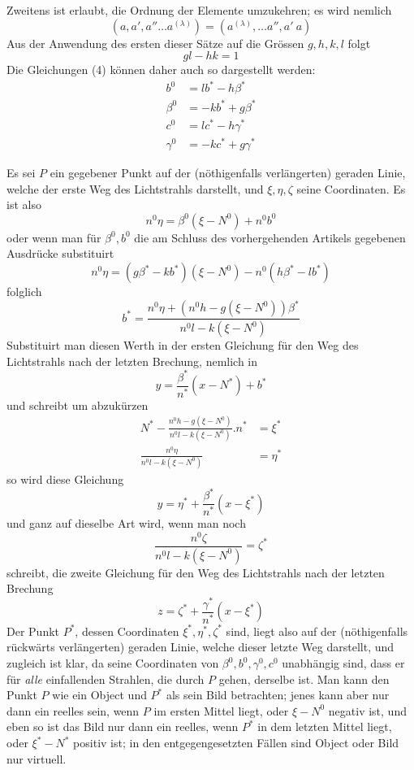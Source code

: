 Zweitens ist erlaubt, die Ordnung der Elemente umzukehren; es wird nemlich
\[
(a,a',a''\ldots a^{(\lambda)})=(a^{(\lambda)},\ldots a'',a'\ a)
\]
Aus der Anwendung des ersten dieser Sätze auf die Grössen $g,h,k,l$ folgt
\[
gl-hk=1
\]
Die Gleichungen (4) können daher auch so dargestellt werden:
\[
\begin{aligned}
b^0&=lb^*-h\beta^*\\
\beta^0&=-kb^*+g\beta^*\\
c^0&=lc^*-h\gamma^*\\
\gamma^0&=-kc^*+g\gamma^*
\end{aligned}
\]

Es sei $P$ ein gegebener Punkt auf der (nöthigenfalls verlängerten) geraden Linie, welche der erste Weg des Lichtstrahls darstellt, und $\xi,\eta,\zeta$ seine Coordinaten. Es ist also
\[
n^0\eta=\beta^0(\xi-N^0)+n^0b^0
\]
oder wenn man für $\beta^0,b^0$ die am Schluss des vorhergehenden Artikels gegebenen Ausdrücke substituirt
\[
n^0\eta=(g\beta^*-kb^*)(\xi-N^0)-n^0(h\beta^*-lb^*)
\]
folglich
\[
b^*=\frac{n^0\eta+(n^0h-g(\xi-N^0))\beta^*}{n^0l-k(\xi-N^0)}
\]
Substituirt man diesen Werth in der ersten Gleichung für den Weg des Lichtstrahls nach der letzten Brechung, nemlich in
\[
y=\frac{\beta^*}{n^*}(x-N^*)+b^*
\]
und schreibt um abzukürzen
\[
\begin{aligned}
N^*-\frac{n^0h-g(\xi-N^0)}{n^0l-k(\xi-N^0)}.n^*&=\xi^*\\
\frac{n^0\eta}{n^0l-k(\xi-N^0)}&=\eta^*
\end{aligned}
\]
so wird diese Gleichung
\[
y=\eta^*+\frac{\beta^*}{n^*}(x-\xi^*)
\]
und ganz auf dieselbe Art wird, wenn man noch
\[
\frac{n^0\zeta}{n^0l-k(\xi-N^0)}=\zeta^*
\]
schreibt, die zweite Gleichung für den Weg des Lichtstrahls nach der letzten Brechung
\[
z=\zeta^*+\frac{\gamma^*}{n^*}(x-\xi^*)
\]
Der Punkt $P^*$, dessen Coordinaten $\xi^*,\eta^*,\zeta^*$ sind, liegt also auf der (nöthigenfalls rückwärts verlängerten) geraden Linie, welche dieser letzte Weg darstellt, und zugleich ist klar, da seine Coordinaten von $\beta^0,b^0,\gamma^0,c^0$ unabhängig sind, dass er für \textit{alle} einfallenden Strahlen, die durch $P$ gehen, derselbe ist. Man kann den Punkt $P$ wie ein Object und $P^*$ als sein Bild betrachten; jenes kann aber nur dann ein reelles sein, wenn $P$ im ersten Mittel liegt, oder $\xi-N^0$ negativ ist, und eben so ist das Bild nur dann ein reelles, wenn $P^*$ in dem letzten Mittel liegt, oder $\xi^*-N^*$ positiv ist; in den entgegengesetzten Fällen sind Object oder Bild nur virtuell.

